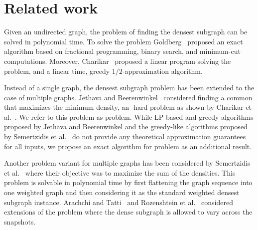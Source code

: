 \section{Related work}\label{sec:related}

Given an undirected graph, the problem of finding the densest subgraph can be solved in polynomial time. To solve the problem Goldberg~\cite{goldberg1984finding} proposed
an exact algorithm based on fractional programming, binary search, and minimum-cut computations. Moreover, Charikar~\cite{charikar2000greedy} proposed a linear program solving the problem, and a linear time, greedy $1/2$-approximation algorithm.

Instead of a single graph, the densest subgraph problem has been extended to the case of multiple graphs.
Jethava and Beerenwinkel~\cite{jethava2015finding} considered finding a common that maximizes the minimum density, an \np-hard problem as shown by Charikar et al.~\cite{charikar_on_finsing_dcs}.
We refer to this problem as \problemdcs problem. 
While LP-based and greedy algorithms proposed by Jethava and Beerenwinkel\cite{jethava2015finding} and the greedy-like algorithms proposed by Semertzidis et al.~\cite{semertzidis2019finding}  do not provide any theoretical approximation guarantees for all inputs, we propose an exact algorithm for \problemdcs problem as an additional result.

 Another problem variant for multiple graphs has been considered by Semertzidis et al.~\cite{semertzidis2019finding} where their objective was to maximize the sum of the densities. This problem is solvable in polynomial time by first flattening the graph sequence into one weighted graph and then considering it as the standard weighted densest subgraph instance. Arachchi and Tatti~\cite{arachchi2023jaccard} and Rozenshtein et al.~\cite{rozenshtein2020finding} considered extensions of the problem where the dense subgraph is allowed to vary across the snapshots.
 

